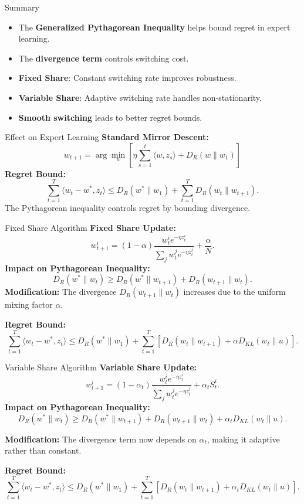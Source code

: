 \documentclass[handout]{beamer}
\begin{document}
\begin{frame}{Summary}
\begin{itemize}
    \item The \textbf{Generalized Pythagorean Inequality} helps bound regret in expert learning.
    \item The \textbf{divergence term} controls \textcolor{mathcolor}{switching cost}.
    \item \textbf{Fixed Share}: \textcolor{mathcolor}{Constant switching rate} improves robustness.
    \item \textbf{Variable Share}: \textcolor{mathcolor}{Adaptive switching rate} handles non-stationarity.
    \item \textbf{Smooth switching} leads to \textcolor{mathcolor}{better regret bounds}.
\end{itemize}
\end{frame}

\begin{frame}{Effect on Expert Learning}
\textbf{Standard Mirror Descent:}  
\[
w_{t+1} = \arg\min_{w} \left[ \eta \sum_{s=1}^{t} \langle w, z_s \rangle + D_R(w \| w_1) \right]
\]
\textbf{Regret Bound:}  
\[
\sum_{t=1}^{T} \langle w_t - w^*, z_t \rangle \leq D_R(w^* \| w_1) + \sum_{t=1}^{T} D_R(w_t \| w_{t+1}).
\]
\textcolor{mathcolor}{The Pythagorean inequality controls regret by bounding divergence.}
\end{frame}

\begin{frame}{Fixed Share Algorithm}
\textbf{Fixed Share Update:}  
\[
w_{t+1}^i = (1 - \alpha) \frac{w_t^i e^{-\eta z_t^i}}{\sum_j w_t^j e^{-\eta z_t^j}} + \frac{\alpha}{N}.
\]
\textbf{Impact on Pythagorean Inequality:}
\[
D_R(w^* \| w_t) \geq D_R(w^* \| w_{t+1}) + D_R(w_{t+1} \| w_t).
\]
\textbf{Modification:}  
\textcolor{mathcolor}{The divergence \( D_R(w_{t+1} \| w_t) \) increases due to the uniform mixing factor \( \alpha \).}

\textbf{Regret Bound:}  
\[
\sum_{t=1}^{T} \langle w_t - w^*, z_t \rangle \leq D_R(w^* \| w_1) + \sum_{t=1}^{T} \left[ D_R(w_t \| w_{t+1}) + \alpha D_{KL}(w_t \| u) \right].
\]
\end{frame}

\begin{frame}{Variable Share Algorithm}
\textbf{Variable Share Update:}  
\[
w_{t+1}^i = (1 - \alpha_t) \frac{w_t^i e^{-\eta z_t^i}}{\sum_j w_t^j e^{-\eta z_t^j}} + \alpha_t S_t^i.
\]
\textbf{Impact on Pythagorean Inequality:}
\[
D_R(w^* \| w_t) \geq D_R(w^* \| w_{t+1}) + D_R(w_{t+1} \| w_t) + \alpha_t D_{KL}(w_t \| u).
\]

\textbf{Modification:}  
\textcolor{mathcolor}{The divergence term now depends on \( \alpha_t \), making it adaptive rather than constant.}

\textbf{Regret Bound:}  
\[
\sum_{t=1}^{T} \langle w_t - w^*, z_t \rangle \leq D_R(w^* \| w_1) + \sum_{t=1}^{T} \left[ D_R(w_t \| w_{t+1}) + \alpha_t D_{KL}(w_t \| u) \right].
\]
\end{frame}
\end{document}
